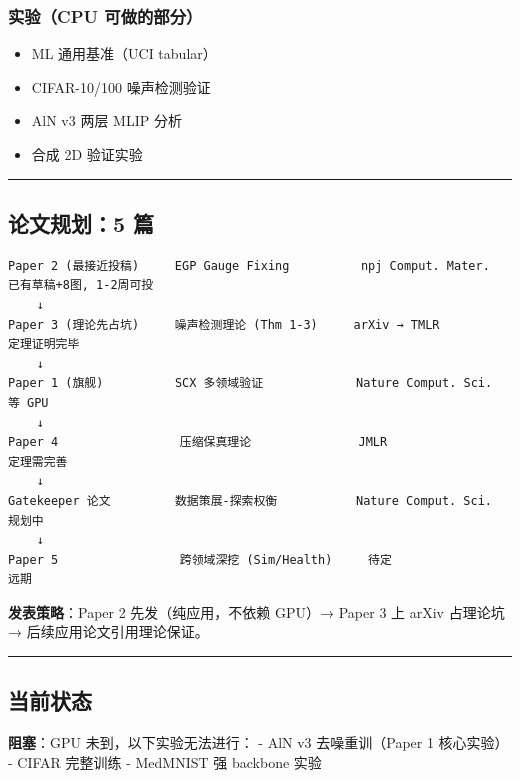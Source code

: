 \documentclass[
  12pt,
]{ctexart}
\providecommand{\tightlist}{%
  \setlength{\itemsep}{0pt}\setlength{\parskip}{0pt}}
\begin{document}
\subsubsection{实验（CPU
可做的部分）}\label{ux5b9eux9a8ccpu-ux53efux505aux7684ux90e8ux5206}

\begin{itemize}
\tightlist
\item
  ML 通用基准（UCI tabular）
\item
  CIFAR-10/100 噪声检测验证
\item
  AlN v3 两层 MLIP 分析
\item
  合成 2D 验证实验
\end{itemize}

\begin{center}\rule{0.5\linewidth}{0.5pt}\end{center}

\subsection{论文规划：5 篇}\label{ux8bbaux6587ux89c4ux52125-ux7bc7}

\begin{verbatim}
Paper 2 (最接近投稿)     EGP Gauge Fixing          npj Comput. Mater.    已有草稿+8图, 1-2周可投
    ↓
Paper 3 (理论先占坑)     噪声检测理论 (Thm 1-3)     arXiv → TMLR          定理证明完毕
    ↓
Paper 1 (旗舰)          SCX 多领域验证             Nature Comput. Sci.   等 GPU
    ↓
Paper 4                 压缩保真理论               JMLR                  定理需完善
    ↓
Gatekeeper 论文         数据策展-探索权衡           Nature Comput. Sci.   规划中
    ↓
Paper 5                 跨领域深挖 (Sim/Health)     待定                  远期
\end{verbatim}

\textbf{发表策略}：Paper 2 先发（纯应用，不依赖 GPU）→ Paper 3 上 arXiv
占理论坑 → 后续应用论文引用理论保证。

\begin{center}\rule{0.5\linewidth}{0.5pt}\end{center}

\subsection{当前状态}\label{ux5f53ux524dux72b6ux6001}

\textbf{阻塞}：GPU 未到，以下实验无法进行： - AlN v3 去噪重训（Paper 1
核心实验） - CIFAR 完整训练 - MedMNIST 强 backbone 实验
\end{document}
